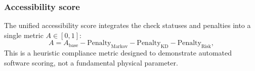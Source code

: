 \subsubsection{Accessibility score}
The unified accessibility score integrates the check statuses and penalties into a single metric $A \in [0, 1]$:
\begin{equation}
  A = A_{\text{base}} - \text{Penalty}_{\text{Markov}} - \text{Penalty}_{\text{KD}} - \text{Penalty}_{\text{Risk}},
  \label{eq:accessibility}
\end{equation}
This is a heuristic compliance metric designed to demonstrate automated software scoring, not a fundamental physical parameter.
